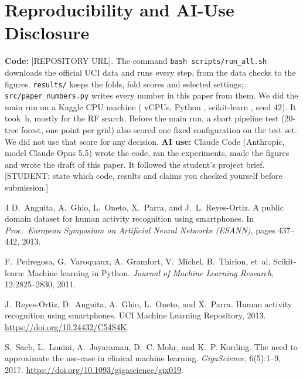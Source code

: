 \documentclass{article}
\begin{document}
\section{Reproducibility and AI-Use Disclosure}
\textbf{Code:} [REPOSITORY URL]. The command \texttt{bash scripts/run\_all.sh} downloads the official UCI data and runs every step, from the data checks to the figures. \texttt{results/} keeps the folds, fold scores and selected settings; \texttt{src/paper\_numbers.py} writes every number in this paper from them. We did the main run on a Kaggle CPU machine (\Nncpu{} vCPUs, Python \Npyver, scikit-learn \Nsklearn, seed 42). It took \Nrunhours{}\,h, mostly for the RF search. Before the main run, a short pipeline test (20-tree forest, one point per grid) also scored one fixed configuration on the test set. We did not use that score for any decision.
\textbf{AI use:} Claude Code (Anthropic, model Claude Opus 5.5) wrote the code, ran the experiments, made the figures and wrote the draft of this paper. It followed the student's project brief. [STUDENT: state which code, results and claims you checked yourself before submission.]

\begin{thebibliography}{4}
D.~Anguita, A.~Ghio, L.~Oneto, X.~Parra, and J.~L. Reyes-Ortiz.
\newblock A public domain dataset for human activity recognition using smartphones.
\newblock In \emph{Proc.\ European Symposium on Artificial Neural Networks (ESANN)}, pages 437--442, 2013.

F.~Pedregosa, G.~Varoquaux, A.~Gramfort, V.~Michel, B.~Thirion, et~al.
\newblock Scikit-learn: Machine learning in {P}ython.
\newblock \emph{Journal of Machine Learning Research}, 12:2825--2830, 2011.

J.~Reyes-Ortiz, D.~Anguita, A.~Ghio, L.~Oneto, and X.~Parra.
\newblock Human activity recognition using smartphones.
\newblock UCI Machine Learning Repository, 2013. \url{https://doi.org/10.24432/C54S4K}.

S.~Saeb, L.~Lonini, A.~Jayaraman, D.~C. Mohr, and K.~P. Kording.
\newblock The need to approximate the use-case in clinical machine learning.
\newblock \emph{GigaScience}, 6(5):1--9, 2017. \url{https://doi.org/10.1093/gigascience/gix019}.
\end{thebibliography}
\end{document}
